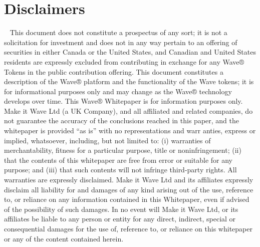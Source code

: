 \documentclass[letterpaper,10pt,english]{sphinxmanual}
\begin{document}
\section{Disclaimers}
\label{\detokenize{index:disclaimers}}
  This document does not constitute a prospectus of any sort; it is not a solicitation for investment and does not in any way pertain to an offering of securities in either Canada or the United States, and Canadian and United States residents are expressly excluded from contributing in exchange for any Wave® Tokens in the public contribution offering. This document constitutes a description of the Wave® platform and the functionality of the Wave tokens; it is for informational purposes only and may change as the Wave® technology develops over time. This Wave® Whitepaper is for information purposes only. Make it Wave Ltd (a UK Company), and all affiliated and related companies, do not guarantee the accuracy of the conclusions reached in this paper, and the whitepaper is provided “as is” with no representations and warr anties, express or implied, whatsoever, including, but not limited to: (i) warranties of merchantability, fitness for a particular purpose, title or noninfringement; (ii) that the contents of this whitepaper are free from error or suitable for any purpose; and (iii) that such contents will not infringe third-party rights. All warranties are expressly disclaimed. Make it Wave Ltd and its affiliates expressly disclaim all liability for and damages of any kind arising out of the use, reference to, or reliance on any information contained in this Whitepaper, even if advised of the possibility of such damages. In no event will Make it Wave Ltd, or its affiliates be liable to any person or entity for any direct, indirect, special or consequential damages for the use of, reference to, or reliance on this whitepaper or any of the content contained herein.
\end{document}
